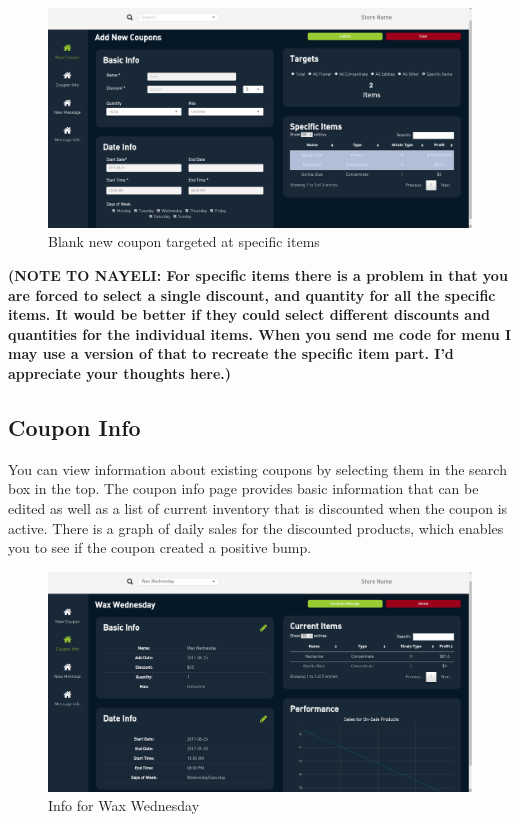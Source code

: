 \documentclass[]{book}
\theoremstyle{definition}
\theoremstyle{definition}
\theoremstyle{definition}
\theoremstyle{remark}
\begin{document}
\begin{figure}
\centering
\includegraphics{images/C3.png}
\caption{Blank new coupon targeted at specific items}
\end{figure}

\textbf{(NOTE TO NAYELI: For specific items there is a problem in that
you are forced to select a single discount, and quantity for all the
specific items. It would be better if they could select different
discounts and quantities for the individual items. When you send me code
for menu I may use a version of that to recreate the specific item part.
I'd appreciate your thoughts here.)}

\subsection{Coupon Info}\label{coupon-info}

You can view information about existing coupons by selecting them in the
search box in the top. The coupon info page provides basic information
that can be edited as well as a list of current inventory that is
discounted when the coupon is active. There is a graph of daily sales
for the discounted products, which enables you to see if the coupon
created a positive bump.

\begin{figure}
\centering
\includegraphics{images/C4.png}
\caption{Info for Wax Wednesday}
\end{figure}
\end{document}
